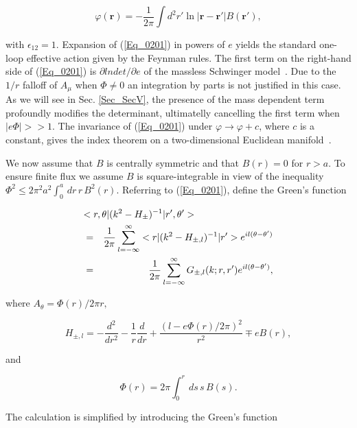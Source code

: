 \documentclass[a4paper,twocolumn,showpacs,preprintnumbers,amsmath,amssymb]{revtex4}
\newcommand{\odo}[1]{\ensuremath{\frac{d}{d #1}}}
\newcommand{\odho}[2]{\ensuremath{\frac{d^{#1}}{d #2^{#1} }}}
\begin{document}
\begin{equation}
\label{Eq_0202}
\varphi(\textbf{r}) =
	-\frac{1}{2\pi} \int d^2r'
	\ln |\textbf{r} - \textbf{r}'| B(\textbf{r}'),
\end{equation}

\noindent
with $\epsilon_{12} = 1$. Expansion of (\ref{Eq_0201}) in powers of $e$
yields the standard one-loop effective action given by the Feynman
rules. The first term on the right-hand side of (\ref{Eq_0201}) is
$\partial lndet / \partial e$ of the massless Schwinger
model~\cite{Schwinger62}. Due to the $1/r$ falloff of $A_{\mu}$ when
$\Phi \ne 0$ an integration by parts is not justified in this case. As
we will see in Sec. \ref{Sec_SecV}, the presence of the mass dependent
term profoundly modifies the determinant, ultimatelly cancelling the
first term when $|e \Phi| >> 1$. The invariance of (\ref{Eq_0201})
under $\varphi \to \varphi + c$, where $c$ is a constant, gives the
index theorem on a two-dimensional Euclidean manifold~\cite{Fry93,Musto86}.

We now assume that $B$ is centrally symmetric and that $B(r) = 0$ for
$r > a$. To ensure finite flux we assume $B$ is square-integrable in view
of the inequality
$\Phi^2 \leq 2 \pi^2 a^2 \int^a_0 \, dr \, r \, B^2(r)$.
Referring to (\ref{Eq_0201}), define the Green's function

\begin{eqnarray}
\nonumber
\lefteqn{<r,\theta |(k^2 - H_{\pm})^{-1}| r',\theta'>}        \\
\nonumber
	&=& \frac{1}{2 \pi} \sum^{\infty}_{l=-\infty}
	<r | (k^2 - H_{\pm,l})^{-1} | r'> e^{il(\theta - \theta')}\\
\label{Eq_0203}
	&=& \frac{1}{2 \pi} \sum^{\infty}_{l=-\infty}
            G_{\pm,l}(k;r,r') e^{il(\theta - \theta')},
\end{eqnarray}

\noindent
where $A_{\theta} = \Phi(r) / 2 \pi r,$

\begin{equation}
\label{Eq_0204}
H_{\pm, l} = - \odho{2}{r} - \frac{1}{r} \odo{r}
	+ \frac{(l - e\Phi(r) / 2\pi)^2}{r^2} \mp e B(r),
\end{equation} 

and

\begin{equation}
\label{Eq_0205}
\Phi(r) = 2 \pi \int^{r}_{0} \, ds \, s \, B(s). 
\end{equation}

The calculation is simplified by introducing the Green's function
\end{document}
